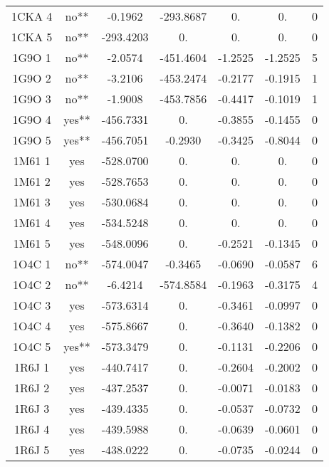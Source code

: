 \begin{table}[h]
{\begin{tabular}{ccccccc}
        1CKA 4 & no**   & -0.1962 & -293.8687   & 0.      & 0. & 0 \\               
        1CKA 5 & no**   &  -293.4203 &  0. & 0.      & 0. & 0 \\           
        1G9O 1 & no**   &  -2.0574   & -451.4604  & -1.2525 & -1.2525 & 5 \\ 
        1G9O 2 & no**   &  -3.2106   & -453.2474  & -0.2177 & -0.1915 & 1 \\ 
        1G9O 3 & no**   &  -1.9008   & -453.7856  & -0.4417 & -0.1019 & 1 \\ 
        1G9O 4 & yes**   & -456.7331 & 0.        & -0.3855 & -0.1455 & 0 \\ 
        1G9O 5 & yes**   & -456.7051  & -0.2930  & -0.3425 & -0.8044 & 0 \\ 
        1M61 1 & yes  & -528.0700 & 0.          & 0.      & 0. & 0 \\               
        1M61 2 & yes  & -528.7653 & 0.          & 0.      & 0. & 0 \\               
        1M61 3 & yes  & -530.0684 & 0.           & 0.      & 0. & 0 \\               
        1M61 4 & yes  & -534.5248 & 0.           & 0.     & 0.& 0 \\               
        1M61 5 & yes  & -548.0096 & 0.           & -0.2521 & -0.1345 & 0 \\     
        1O4C 1 & no**  &  -574.0047 & -0.3465     & -0.0690 & -0.0587 & 6 \\    
        1O4C 2 & no**   &  -6.4214   & -574.8584   & -0.1963 & -0.3175 & 4 \\         
        1O4C 3 & yes  & -573.6314 &  0.          & -0.3461 & -0.0997 & 0 \\             
        1O4C 4 & yes  & -575.8667 &  0.          & -0.3640 & -0.1382 & 0 \\             
        1O4C 5 & yes** & -573.3479 &  0.          & -0.1131 & -0.2206 & 0 \\      
        1R6J 1 & yes  & -440.7417 &  0.          & -0.2604 & -0.2002 & 0 \\        
        1R6J 2 & yes  & -437.2537 &  0.          & -0.0071 & -0.0183 & 0 \\        
        1R6J 3 & yes  & -439.4335 &  0.          & -0.0537 & -0.0732 & 0 \\       
        1R6J 4 & yes  & -439.5988 &  0.          & -0.0639 & -0.0601 & 0 \\        
        1R6J 5 & yes  & -438.0222 &  0.          & -0.0735 & -0.0244 & 0 \\        

\end{tabular}}
\end{table}
